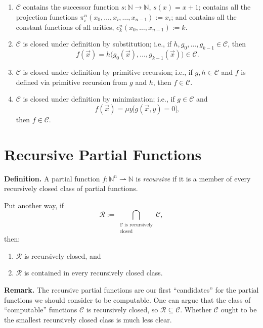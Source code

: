 \documentclass[11pt]{article}
\begin{document}
\begin{enumerate}[leftmargin=1.8em, label=\arabic*)]
    \item $\mathcal{C}$ contains the successor function $s\colon \mathbb{N} \to \mathbb{N}$, $s(x) = x + 1$; contains all the projection functions $\pi^n_i(x_0, \dots, x_i, \dots, x_{n-1}) := x_i$; and contains all the constant functions of all arities, $c^n_k(x_0, \dots, x_{n-1}) := k$.

    \item $\mathcal{C}$ is closed under definition by substitution; i.e., if $h, g_0, \dots, g_{k-1} \in \mathcal{C}$, then
    \[
        f(\vec{x}) = h\bigl(g_0(\vec{x}), \dots, g_{k-1}(\vec{x})\bigr) \in \mathcal{C}.
    \]

    \item $\mathcal{C}$ is closed under definition by primitive recursion; i.e., if $g, h \in \mathcal{C}$ and $f$ is defined via primitive recursion from $g$ and $h$, then $f \in \mathcal{C}$.

    \item $\mathcal{C}$ is closed under definition by minimization; i.e., if $g \in \mathcal{C}$ and
    \[
        f(\vec{x}) = \mu y\bigl[g(\vec{x}, y) = 0\bigr],
    \]
    then $f \in \mathcal{C}$.
\end{enumerate}

\section{Recursive Partial Functions}

\textbf{Definition.} A partial function $f\colon \mathbb{N}^n \rightharpoonup \mathbb{N}$ is \emph{recursive} if it is a member of every recursively closed class of partial functions.

Put another way, if
\[
    \mathcal{R} := \bigcap_{\substack{\mathcal{C} \text{ is recursively} \\ \text{closed}}} \mathcal{C},
\]
then:
\begin{enumerate}[leftmargin=1.8em, label=(\Alph*)]
    \item $\mathcal{R}$ is recursively closed, and
    \item $\mathcal{R}$ is contained in every recursively closed class.
\end{enumerate}

\textbf{Remark.} The recursive partial functions are our first ``candidates'' for the partial functions we should consider to be computable. One can argue that the class of ``computable'' functions $\mathcal{C}$ is recursively closed, so $\mathcal{R} \subseteq \mathcal{C}$. Whether $\mathcal{C}$ ought to be the smallest recursively closed class is much less clear.
\end{document}
